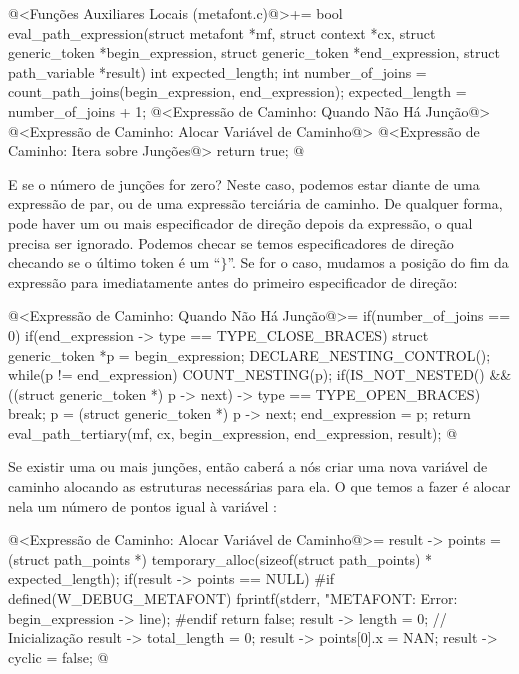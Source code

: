 \iniciocodigo
@<Funções Auxiliares Locais (metafont.c)@>+=
bool eval_path_expression(struct metafont *mf, struct context *cx,
                          struct generic_token *begin_expression,
                          struct generic_token *end_expression,
                          struct path_variable *result){
  int expected_length;
  int number_of_joins = count_path_joins(begin_expression, end_expression);
  expected_length = number_of_joins + 1;
  @<Expressão de Caminho: Quando Não Há Junção@>
  @<Expressão de Caminho: Alocar Variável de Caminho@>
  @<Expressão de Caminho: Itera sobre Junções@>
  return true;
}
@
\fimcodigo

E se o número de junções for zero? Neste caso, podemos estar diante de
uma expressão de par, ou de uma expressão terciária de caminho. De
qualquer forma, pode haver um ou mais especificador de direção depois
da expressão, o qual precisa ser ignorado. Podemos checar se temos
especificadores de direção checando se o último token é um
``$\}$''. Se for o caso, mudamos a posição do fim da expressão para
imediatamente antes do primeiro especificador de direção:

\iniciocodigo
@<Expressão de Caminho: Quando Não Há Junção@>=
if(number_of_joins == 0){
  if(end_expression -> type == TYPE_CLOSE_BRACES){
    struct generic_token *p = begin_expression;
    DECLARE_NESTING_CONTROL();
    while(p != end_expression){
      COUNT_NESTING(p);
      if(IS_NOT_NESTED() &&
         ((struct generic_token *) p -> next) -> type == TYPE_OPEN_BRACES)
        break;
      p = (struct generic_token *) p -> next;
    }
    end_expression = p;
  }
  return eval_path_tertiary(mf, cx, begin_expression, end_expression,
                            result);
}
@
\fimcodigo

Se existir uma ou mais junções, então caberá a nós criar uma nova
variável de caminho alocando as estruturas necessárias para ela. O que
temos a fazer é alocar nela um número de pontos igual à
variável :

\iniciocodigo
@<Expressão de Caminho: Alocar Variável de Caminho@>=
result -> points = (struct path_points *)
                     temporary_alloc(sizeof(struct path_points) *
                     expected_length);
if(result -> points == NULL){
#if defined(W_DEBUG_METAFONT)
  fprintf(stderr, "METAFONT: Error: %
          begin_expression -> line);
#endif
    return false;
}
result -> length = 0; // Inicialização
result -> total_length = 0;
result -> points[0].x = NAN;
result -> cyclic = false;
@
\fimcodigo

